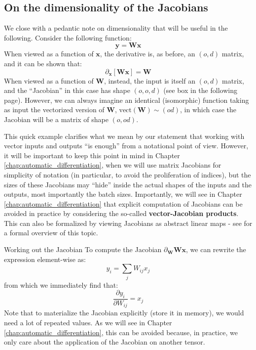 \subsection*{On the dimensionality of the Jacobians \addteacup}
%
We close with a pedantic note on dimensionality that will be useful in the following.   Consider the following function:
%
$$
\mathbf{y} = \mathbf{W}\mathbf{x}
$$
%
When viewed as a function of $\mathbf{x}$, the derivative is, as before, an $(o, d)$ matrix, and it can be shown that:
%
$$
\partial_{\mathbf{x}}\left[\mathbf{W}\mathbf{x}\right] =\mathbf{W}
$$
%
When viewed as a function of $\mathbf{W}$, instead, the input is itself an $(o, d)$ matrix, and the “Jacobian” in this case has shape $(o,o,d)$ (see box in the following page). However, we can always imagine an identical (isomorphic) function taking as input the vectorized version of $\mathbf{W}$, $\text{vect}(\mathbf{W})  \sim(od)$, in which case the Jacobian will be a matrix of shape $(o, od)$.

This quick example clarifies what we mean by our statement that working with vector inputs and outputs “is enough” from a notational point of view. However, it will be important to keep this point in mind in Chapter \ref{chap:automatic_differentiation}, when we will use matrix Jacobians for simplicity of notation (in particular, to avoid the proliferation of indices), but the sizes of these Jacobians may “hide” inside the actual shapes of the inputs and the outputs, most importantly the batch sizes. Importantly, we will see in Chapter \ref{chap:automatic_differentiation} that explicit computation of Jacobians can be avoided in practice by considering the so-called \textbf{vector-Jacobian products}. This can also be formalized by viewing Jacobians as abstract linear maps - see \cite{blondel2024elements} for a formal overview of this topic.

\begin{supportbox}{Working out the Jacobian}
To compute the Jacobian $\partial_{\mathbf{W}} \mathbf{W}\mathbf{x}$, we can rewrite the expression element-wise as:
%
$$
y_i=\sum_j W_{ij}x_j
$$
%
from which we immediately find that:
%
\begin{equation}
\frac{\partial y_i}{\partial W_{ij}}=x_j
\label{eq:partial_yi_wij}
\end{equation}
%
Note that to materialize the Jacobian explicitly (store it in memory), we would need a lot of repeated values. As we will see in Chapter \ref{chap:automatic_differentiation}, this can be avoided because, in practice, we only care about the application of the Jacobian on another tensor.
\label{supportbox:jacobian}
\end{supportbox}

